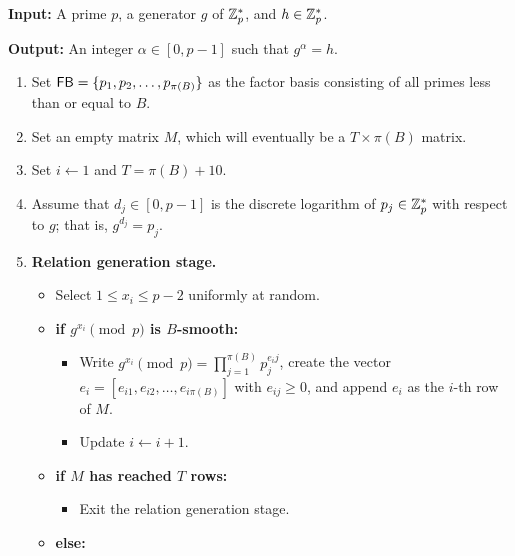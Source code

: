 \begin{algo}~

      {\bf Input:} A prime $p$, a generator $g$ of $\mathbb{Z}_p^*$, and $h \in \mathbb{Z}_p^*$. 
      
      {\bf Output:} An integer $\alpha \in [0, p-1]$ such that $g^\alpha = h$.

      \begin{enumerate}[1.]
            \item Set ${\sf FB} = \{p_1, p_2, \dots, p_{\pi(B)}\}$ as the factor basis 
                  consisting of all primes less than or equal to $B$. 
            \item Set an empty matrix $M$, which will eventually be a $T \times 
                  \pi(B)$ matrix. 
            \item Set $i \gets 1$ and $T = \pi(B) + 10$. 
            \item Assume that $d_j \in [0, p-1]$ is the discrete logarithm 
                  of $p_j \in \mathbb{Z}_p^*$ with respect to $g$; that is, $g^{d_j} = p_j$.
            \item {\bf Relation generation stage.} 
                  \begin{itemize}
                        \item Select $1 \leq x_i \leq p-2$ uniformly at random. 
                        \item {\bf if $g^{x_i} \pmod p$ is $B$-smooth:}
                              \begin{itemize}
                                    \item Write $g^{x_i} \pmod p = \prod_{j=1}^{\pi(B)} p_j^{e_ij}$, create the 
                                          vector $e_i = [e_{i1}, e_{i2}, \dots, e_{i\pi(B)}]$ with $e_{ij} \geq 0$, 
                                          and append $e_i$ as the $i$-th row of $M$. 
                                    \item Update $i \gets i+1$. 
                              \end{itemize}
                        \item {\bf if $M$ has reached $T$ rows:} 
                              \begin{itemize}
                                    \item Exit the relation generation stage. 
                              \end{itemize}
                        \item {\bf else:} 
                              \begin{itemize}

\end{itemize}
\end{itemize}
\end{enumerate}
\end{algo}
